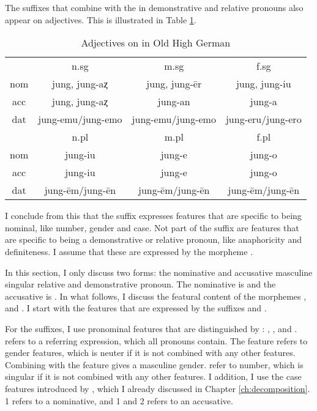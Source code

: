 The suffixes that combine with the  in demonstrative and relative pronouns also appear on adjectives. This is illustrated in Table \ref{tbl:adj-ohg}.

\begin{table}[H]
 \center
 \caption {Adjectives on  in Old High German }
  \begin{tabular}{cccc}
  \toprule
            & \ac{n}.\ac{sg}    & \ac{m}.\ac{sg}      & \ac{f}.\ac{sg}    \\
    \cmidrule{2-4}
  \ac{nom}  & jung, jung-aȥ     & jung, jung-ēr       & jung, jung-iu     \\
  \ac{acc}  & jung, jung-aȥ     & jung-an             & jung-a            \\
  \ac{dat}  & jung-emu/jung-emo & jung-emu/jung-emo   & jung-eru/jung-ero \\
  \bottomrule
            & \ac{n}.\ac{pl}    & \ac{m}.\ac{pl}      &  \ac{f}.\ac{pl}   \\
      \cmidrule{2-4}
  \ac{nom}  & jung-iu           &  jung-e             & jung-o            \\
  \ac{acc}  & jung-iu           &  jung-e             & jung-o            \\
  \ac{dat}  & jung-ēm/jung-ēn   &  jung-ēm/jung-ēn    & jung-ēm/jung-ēn   \\
    \bottomrule
  \end{tabular}
  \label{tbl:adj-ohg}
\end{table}

I conclude from this that the suffix expresses features that are specific to being nominal, like number, gender and case. Not part of the suffix are features that are specific to being a demonstrative or relative pronoun, like anaphoricity and definiteness. I assume that these are expressed by the morpheme .

In this section, I only discuss two forms: the nominative and accusative masculine singular relative and demonstrative pronoun. The nominative is  and the accusative is . In what follows, I discuss the featural content of the morphemes ,  and . I start with the features that are expressed by the suffixes  and .

For the suffixes, I use pronominal features that are distinguished by \citet{harley2002}: , ,  and .  refers to a referring expression, which all pronouns contain. The feature  refers to gender features, which is neuter if it is not combined with any other features. Combining  with the feature  gives a masculine gender.  refer to number, which is singular if it is not combined with any other features.
I addition, I use the case features introduced by \citet{caha2009}, which I already discussed in Chapter \ref{ch:decomposition}. 1 refers to a nominative, and 1 and 2 refers to an accusative.

